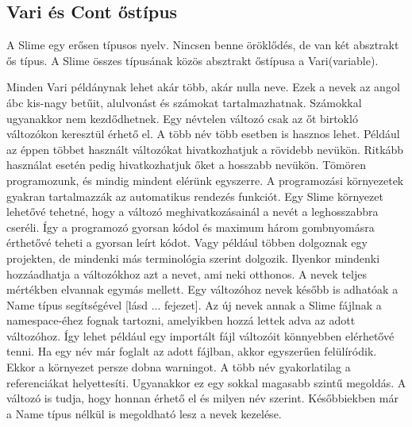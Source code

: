 
\subsection{Vari és Cont őstípus}
A Slime egy erősen típusos nyelv.
Nincsen benne öröklődés, de van két absztrakt ős típus.
A Slime összes típusának közös absztrakt őstípusa a Vari(variable).

Minden Vari példánynak lehet akár több, akár nulla neve.
Ezek a nevek az angol ábc kis-nagy betűit, alulvonást és számokat tartalmazhatnak. 
Számokkal ugyanakkor nem kezdődhetnek.
Egy névtelen változó csak az őt birtokló változókon keresztül érhető el.
A több név több esetben is hasznos lehet.
Például az éppen többet használt változókat hivatkozhatjuk a rövidebb nevükön.
Ritkább használat esetén pedig hivatkozhatjuk őket a hosszabb nevükön.
Tömören programozunk, és mindig mindent elérünk egyszerre.
A programozási környezetek gyakran tartalmazzák az automatikus rendezés funkciót.
Egy Slime környezet lehetővé tehetné, hogy a változó meghivatkozásainál a nevét a leghosszabbra cseréli.
Így a programozó gyorsan kódol és maximum három gombnyomásra érthetővé teheti a gyorsan leírt kódot. 
Vagy például többen dolgoznak egy projekten, de mindenki más terminológia szerint dolgozik.
Ilyenkor mindenki hozzáadhatja a változókhoz azt a nevet, ami neki otthonos.
A nevek teljes mértékben elvannak egymás mellett.
Egy változóhoz nevek később is adhatóak a Name típus segítségével [lásd ... fejezet].
Az új nevek annak a Slime fájlnak a namespace-éhez fognak tartozni, amelyikben hozzá lettek adva az adott változóhoz. 
Így lehet például egy importált fájl változóit könnyebben elérhetővé tenni.
Ha egy név már foglalt az adott fájlban, akkor egyszerűen felülíródik.
Ekkor a környezet persze dobna warningot.
A több név gyakorlatilag a referenciákat helyettesíti.
Ugyanakkor ez egy sokkal magasabb szintű megoldás.
A változó is tudja, hogy honnan érhető el és milyen név szerint.
Későbbiekben már a Name típus nélkül is megoldható lesz a nevek kezelése. 

